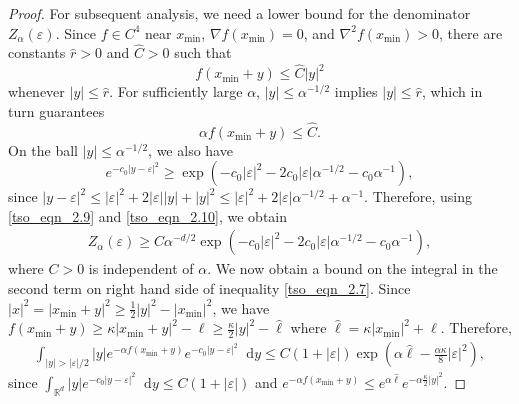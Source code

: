 \documentclass[10pt,a4paper]{amsart}
\newcommand*\der{\mathop{}\!\mathrm{d}}
\begin{document}
\begin{proof}
For subsequent analysis, we need a lower bound for the denominator $Z_\alpha(\varepsilon)$. Since $f \in C^4$ near $x_{\min}$, $\nabla f(x_{\min}) = 0$, and $\nabla^2 f(x_{\min}) > 0$, there are constants $\hat{r} > 0$ and $ \hat{C} > 0$ such that
\begin{equation}\label{tso_eqn_2.8}
f(x_{\min} + y) \leq \hat C |y|^2 
\end{equation}
whenever $|y| \leq \hat{r}$. For sufficiently large $\alpha$, $|y| \le \alpha^{-1/2}$ implies $|y| \le \hat r$, which in turn guarantees
\begin{equation}\label{tso_eqn_2.9}
\alpha f(x_{\min} + y) \leq \hat{C}. 
\end{equation}
On the ball $|y| \leq \alpha^{-1/2}$, we also have 
\begin{equation} \label{tso_eqn_2.10}
e^{-c_0|y-\varepsilon|^2} \geq \exp\left(-c_0|\varepsilon|^2 - 2c_0|\varepsilon|\alpha^{-1/2} - c_0\alpha^{-1}\right),
\end{equation}
since $|y - \varepsilon|^{2} \leq |\varepsilon|^{2} + 2|\varepsilon||y| + |y|^2 \leq |\varepsilon|^2 + 2|\varepsilon|\alpha^{-1/2} + \alpha^{-1}$. Therefore, using \eqref{tso_eqn_2.9} and \eqref{tso_eqn_2.10}, we obtain
\begin{align}\label{tso_eqn_2.11}
Z_\alpha(\varepsilon) \geq C\alpha^{-d/2} \exp\left(- c_0|\varepsilon|^2 - 2c_0|\varepsilon|\alpha^{-1/2} - c_0\alpha^{-1}\right),
\end{align}
where $C>0$ is independent of $\alpha$.  We now obtain a bound on the integral in the second term on right hand side of inequality \eqref{tso_eqn_2.7}. 
Since $|x|^2 = |x_{\min} + y|^2 \geq \frac{1}{2}|y|^2 - |x_{\min}|^2$, we have $f(x_{\min} + y) \geq \kappa |x_{\min} + y|^2 - \ell \ge \frac{\kappa}{2}|y|^2 - \hat{\ell}$ where $\hat{\ell} = \kappa |x_{\min}|^2 + \ell$. 
Therefore,
\begin{align}\label{tso_eqn_2.12}
 \int_{|y| > |\varepsilon| /2} |y| e^{-\alpha f(x_{\min} + y)} e^{-c_0|y - \varepsilon|^2} \der y \le C(1 + |\varepsilon|) \exp\left(\alpha \hat{\ell} - \frac{\alpha \kappa}{8}|\varepsilon|^2\right), 
\end{align} 
since $ \int_{\mathbb{R}^d} |y| e^{-c_0|y - \varepsilon|^2} \der y \le C(1 + |\varepsilon|)$ and $e^{-\alpha f(x_{\min} + y)} \leq e^{\alpha \hat{\ell}} e^{-\alpha \frac{\kappa}{2}| y|^2 }$.

\end{proof}
\end{document}
